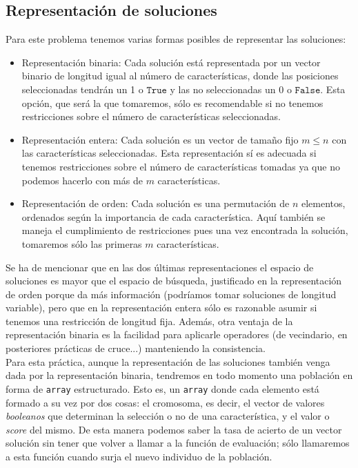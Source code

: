 \documentclass[11pt,leqno]{article}
\begin{document}
\subsection{Representación de soluciones}
	Para este problema tenemos varias formas posibles de representar las soluciones:
	\begin{itemize}
		\item Representación binaria: Cada solución está representada por un vector binario de longitud igual al número de características, donde las posiciones seleccionadas tendrán un 1 o $\texttt{True}$ y las no seleccionadas un 0 o $\texttt{False}$. Esta opción, que será la que tomaremos, sólo es recomendable si no tenemos restricciones sobre el número de características seleccionadas.
		\item Representación entera: Cada solución es un vector de tamaño fijo $m \leq n$ con las características seleccionadas. Esta representación sí es adecuada si tenemos restricciones sobre el número de características tomadas ya que no podemos hacerlo con más de $m$ características.
		\item Representación de orden: Cada solución es una permutación de $n$ elementos, ordenados según la importancia de cada característica. Aquí también se maneja el cumplimiento de restricciones pues una vez encontrada la solución, tomaremos sólo las primeras $m$ características.
	\end{itemize}
	Se ha de mencionar que en las dos últimas representaciones el espacio de soluciones es mayor que el espacio de búsqueda, justificado en la representación de orden porque da más información (podríamos tomar soluciones de longitud variable), pero que en la representación entera sólo es razonable asumir si tenemos una restricción de longitud fija. Además, otra ventaja de la representación binaria es la facilidad para aplicarle operadores (de vecindario, en posteriores prácticas de cruce...) manteniendo la consistencia.\\
	Para esta práctica, aunque la representación de las soluciones también venga dada por la representación binaria, tendremos en todo momento una población en forma de \texttt{array} estructurado. Esto es, un \texttt{array} donde cada elemento está formado a su vez por dos cosas: el cromosoma, es decir, el vector de valores \textit{booleanos} que determinan la selección o no de una característica, y el valor o \textit{score} del mismo. De esta manera podemos saber la tasa de acierto de un vector solución sin tener que volver a llamar a la función de evaluación; sólo llamaremos a esta función cuando surja el nuevo individuo de la población.
\end{document}
